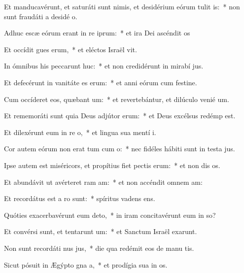 \item Et manducavérunt, et saturáti sunt nimis, et desidérium eórum tulit is:~* non sunt fraudáti a desidé o.
\item Adhuc escæ eórum erant in re iprum:~* et ira Dei ascéndit  os
\item Et occídit gues erum,~* et eléctos Israël vit.
\item In ómnibus his peccarunt huc:~* et non credidérunt in mirabí jus.
\item Et defecérunt in vanitáte es erum:~* et anni eórum cum festine.
\item Cum occíderet eos, quæbant um:~* et revertebántur, et dilúculo venié  um.
\item Et rememoráti sunt quia Deus adjútor  erum:~* et Deus excélsus redémp  est.
\item Et dilexérunt eum in re o,~* et lingua sua mentí  i.
\item Cor autem eórum non erat tum cum o:~* nec fidéles hábiti sunt in testa jus.
\item Ipse autem est miséricors, et propítius fiet pectis erum:~* et non dis os.
\item Et abundávit ut avérteret ram am:~* et non accéndit omnem  am:
\item Et recordátus est a ro sunt:~* spíritus vadens   ens.
\item Quóties exacerbavérunt eum  deto,~* in iram concitavérunt eum in so?
\item Et convérsi sunt, et tentarunt um:~* et Sanctum Israël exarunt.
\item Non sunt recordáti nus jus,~* die qua redémit eos de manu tis.
\item Sicut pósuit in Ægýpto gna a,~* et prodígia sua in  os.
